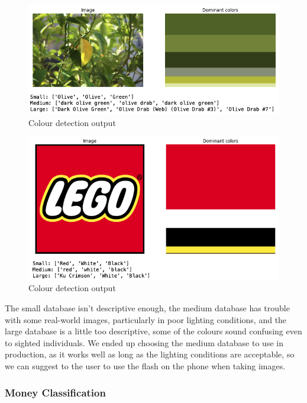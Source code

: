 \documentclass[a4paper,11pt]{article}
\begin{document}
\begin{figure}[H]
\centering
\includegraphics[scale=0.6]{img/cv/colour_detection/colour_detection_3.png}
\caption{Colour detection output}
\label{fig:color-detection-output-3}
\end{figure}


\begin{figure}[H]
\centering
\includegraphics[scale=0.6]{img/cv/colour_detection/colour_detection_4.png}
\caption{Colour detection output}
\label{fig:color-detection-output-4}
\end{figure}

The small database isn't descriptive enough, the medium database has trouble with some real-world images, particularly in poor lighting conditions, and the large database is a little too descriptive, some of the colours sound confusing even to sighted individuals. We ended up choosing the medium database to use in production, as it works well as long as the lighting conditions are acceptable, so we can suggest to the user to use the flash on the phone when taking images.


\subsubsection{Money Classification}
\label{money-class}
\end{document}
